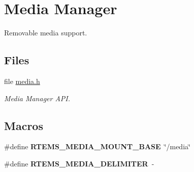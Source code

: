 \hypertarget{group__RTEMSIOMedia}{}\section{Media Manager}
\label{group__RTEMSIOMedia}


Removable media support.  


\subsection*{Files}
\begin{DoxyCompactItemize}
\item 
file \mbox{\hyperlink{media_8h}{media.\+h}}
\begin{DoxyCompactList}\small\item\em Media Manager A\+PI. \end{DoxyCompactList}\end{DoxyCompactItemize}
\subsection*{Macros}
\begin{DoxyCompactItemize}
\item 
\mbox{\label{group__RTEMSIOMedia_ga0a881b139f9fb48f8ef314f355d4bf21}} 
\#define {\bfseries R\+T\+E\+M\+S\+\_\+\+M\+E\+D\+I\+A\+\_\+\+M\+O\+U\+N\+T\+\_\+\+B\+A\+SE}~\char`\"{}/media\char`\"{}
\item 
\mbox{\label{group__RTEMSIOMedia_ga1cd1d8703cd27203ef3a8dcf5de32ebc}} 
\#define {\bfseries R\+T\+E\+M\+S\+\_\+\+M\+E\+D\+I\+A\+\_\+\+D\+E\+L\+I\+M\+I\+T\+ER}~\textquotesingle{}-\/\textquotesingle{}
\end{DoxyCompactItemize}
